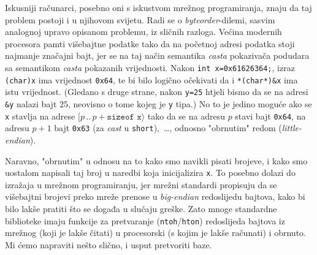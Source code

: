 Iskusniji računarci, posebno oni s iskustvom mrežnog programiranja, znaju da taj problem postoji i u njihovom svijetu. Radi se o \emph{byteorder}-dilemi, sasvim analognoj upravo opisanom problemu, iz sličnih razloga. Većina modernih procesora pamti višebajtne podatke tako da na početnoj adresi podatka stoji najmanje značajni bajt, jer se na taj način semantika \emph{casta} pokazivača podudara sa semantikom \emph{casta} pokazanih vrijednosti. Nakon \texttt{int x=0x61626364;}, izraz \texttt{(char)x} ima vrijednost \texttt{0x64}, te bi bilo logično očekivati da i \texttt{*(char*)\&x} ima istu vrijednost. (Gledano s druge strane, nakon \texttt{y=25} htjeli bismo da se na adresi \texttt{\&y} nalazi bajt $25$, neovisno o tome kojeg je \texttt y tipa.) No to je jedino moguće ako se \texttt x stavlja na adrese $[p\,..\,p+\texttt{sizeof x}\rangle$ tako da se na adresu $p$ stavi bajt \texttt{0x64}, na adresu $p+1$ bajt \texttt{0x63} (za \emph{cast} u \texttt{short}),~\ldots, odnosno "obrnutim" redom (\emph{little-endian}).

Naravno, "obrnutim" u odnosu na to kako smo navikli pisati brojeve, i kako smo uostalom napisali taj broj u naredbi koja inicijalizira \texttt x. To posebno dolazi do izražaja u mrežnom programiranju, jer mrežni standardi propisuju da se višebajtni brojevi preko mreže prenose u \emph{big-endian} redoslijedu bajtova, kako bi bilo lakše pratiti što se događa u slučaju greške. Zato mnoge standardne biblioteke imaju funkcije za pretvaranje (\texttt{ntoh}/\texttt{hton}) redoslijeda bajtova iz mrežnog (koji je lakše čitati) u procesorski (s kojim je lakše računati) i obrnuto. Mi ćemo napraviti nešto slično, i usput pretvoriti baze.

